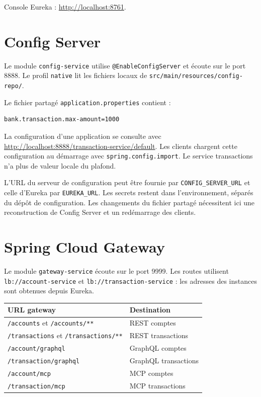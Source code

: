 \documentclass[11pt,a4paper]{report}
\begin{document}
Console Eureka : \url{http://localhost:8761}.

\section{Config Server}

Le module \nolinkurl{config-service} utilise \nolinkurl{@EnableConfigServer} et écoute sur le port 8888. Le profil \nolinkurl{native} lit les fichiers locaux de \nolinkurl{src/main/resources/config-repo/}.

Le fichier partagé \nolinkurl{application.properties} contient :

\begin{lstlisting}
bank.transaction.max-amount=1000
\end{lstlisting}

La configuration d'une application se consulte avec \url{http://localhost:8888/transaction-service/default}. Les clients chargent cette configuration au démarrage avec \nolinkurl{spring.config.import}. Le service transactions n'a plus de valeur locale du plafond.

L'URL du serveur de configuration peut être fournie par \nolinkurl{CONFIG_SERVER_URL} et celle d'Eureka par \nolinkurl{EUREKA_URL}. Les secrets restent dans l'environnement, séparés du dépôt de configuration. Les changements du fichier partagé nécessitent ici une reconstruction de Config Server et un redémarrage des clients.

\section{Spring Cloud Gateway}

Le module \nolinkurl{gateway-service} écoute sur le port 9999. Les routes utilisent \nolinkurl{lb://account-service} et \nolinkurl{lb://transaction-service} : les adresses des instances sont obtenues depuis Eureka.

\begin{table}[H]\centering\small
\begin{tabularx}{\linewidth}{XX}\toprule
URL gateway & Destination\\
\midrule
\nolinkurl{/accounts} et \nolinkurl{/accounts/**} & REST comptes\\
\nolinkurl{/transactions} et \nolinkurl{/transactions/**} & REST transactions\\
\nolinkurl{/account/graphql} & GraphQL comptes\\
\nolinkurl{/transaction/graphql} & GraphQL transactions\\
\nolinkurl{/account/mcp} & MCP comptes\\
\nolinkurl{/transaction/mcp} & MCP transactions\\
\bottomrule\end{tabularx}
\end{table}
\end{document}
